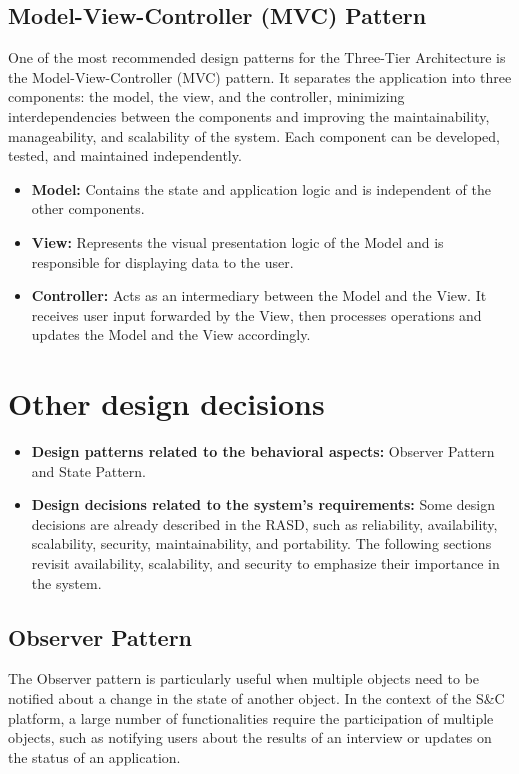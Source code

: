 \subsection{Model-View-Controller (MVC) Pattern}\label{subsec:model-view-controller pattern}
One of the most recommended design patterns for the Three-Tier Architecture is the Model-View-Controller (MVC) pattern. It separates the application into three 
components: the model, the view, and the controller, minimizing interdependencies between the components and improving the maintainability, manageability, and 
scalability of the system. Each component can be developed, tested, and maintained independently.
\begin{itemize}
\item \textbf{Model:} Contains the state and application logic and is independent of the other components.
\item \textbf{View:} Represents the visual presentation logic of the Model and is responsible for displaying data to the user.
\item \textbf{Controller:} Acts as an intermediary between the Model and the View. It receives user input forwarded by the View, then processes operations and 
updates the Model and the View accordingly.
\end{itemize}

\section{Other design decisions}\label{sec:other design decisions}
\begin{itemize}
    \item \textbf{Design patterns related to the behavioral aspects:} Observer Pattern and State Pattern.
    \item \textbf{Design decisions related to the system's requirements:} Some design decisions are already described in the RASD, such as reliability, availability, scalability, security, maintainability, and portability. 
    The following sections revisit availability, scalability, and security to emphasize their importance in the system.
\end{itemize}
\subsection{Observer Pattern}\label{subsec:observer pattern}
The Observer pattern is particularly useful when multiple objects need to be notified about a change in the state of another object. In the context of the S\&C platform, 
a large number of functionalities require the participation of multiple objects, such as notifying users about the results of an interview or updates on the status of an application.

